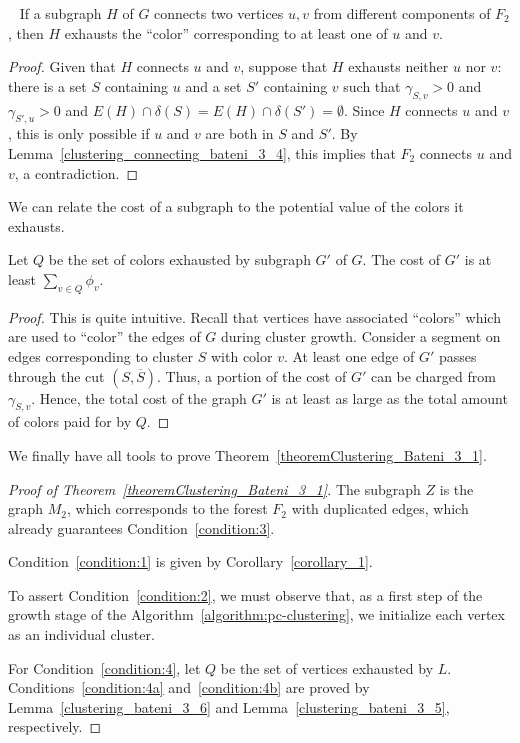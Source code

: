 \begin{flemma}~\label{clustering_bateni_3_5}
    If a subgraph \(H\) of \(G\) connects two vertices \(u, v\) from different components of \(F_2\), then \(H\) exhausts the ``color'' corresponding to at least one of \(u\) and \(v\).
\end{flemma}
\begin{proof}
    Given that \(H\) connects \(u\) and \(v\), suppose that \(H\) exhausts neither \(u\) nor \(v\): there is a set \(S\) containing \(u\) and a set \(S'\) containing \(v\) such that \(\gamma_{S, v} > 0\) and \(\gamma_{S', u} > 0\) and \(E(H) \cap \delta(S) = E(H) \cap \delta(S') = \emptyset\). Since \(H\) connects \(u\) and \(v\), this is only possible if \(u\) and \(v\) are both in \(S\) and \(S'\). By Lemma~\ref{clustering_connecting_bateni_3_4}, this implies that \(F_2\) connects \(u\) and \(v\), a contradiction.
\end{proof}

We can relate the cost of a subgraph to the potential value of the colors it exhausts.

\begin{flemma} \label{clustering_bateni_3_6}
    Let \(Q\) be the set of colors exhausted by subgraph \(G'\) of \(G\). The cost of \(G'\) is at least \(\sum_{v \in Q} \phi_v\).
\end{flemma}
\begin{proof}
    This is quite intuitive. Recall that vertices have associated ``colors'' which are used to ``color'' the edges of \(G\) during cluster growth. Consider a segment on edges corresponding to cluster \(S\) with color \(v\). At least one edge of \(G'\) passes through the cut \((S, \overline{S})\). Thus, a portion of the cost of \(G'\) can be charged from \(\gamma_{S, v}\). Hence, the total cost of the graph \(G'\) is at least as large as the total amount of colors paid for by \(Q\).
\end{proof}

We  finally have all tools to prove Theorem~\ref{theoremClustering_Bateni_3_1}.

\begin{proof}[Proof of Theorem~\ref{theoremClustering_Bateni_3_1}]
The subgraph \(Z\) is the graph \(M_2\), which corresponds to the forest \(F_2\) with duplicated edges, which already guarantees Condition~\eqref{condition:3}.

Condition~\eqref{condition:1} is given by Corollary~\ref{corollary_1}. 

To assert Condition~\eqref{condition:2}, we must observe that, as a first step of the growth stage of the Algorithm~\ref{algorithm:pc-clustering}, we initialize each vertex as an individual cluster.

For Condition~\eqref{condition:4}, let \(Q\) be the set of vertices exhausted by \(L\). Conditions~\eqref{condition:4a} and~\eqref{condition:4b} are proved by Lemma~\ref{clustering_bateni_3_6} and Lemma~\ref{clustering_bateni_3_5}, respectively.

\end{proof}


